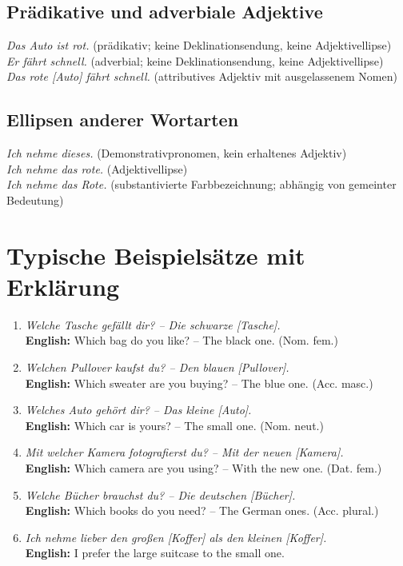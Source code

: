 \documentclass[a4paper,11pt]{article}
\begin{document}
\subsection{Prädikative und adverbiale Adjektive}
\textit{Das Auto ist rot.} (prädikativ; keine Deklinationsendung, keine Adjektivellipse)\\
\textit{Er fährt schnell.} (adverbial; keine Deklinationsendung, keine Adjektivellipse)\\
\textit{Das rote [Auto] fährt schnell.} (attributives Adjektiv mit ausgelassenem Nomen)

\subsection{Ellipsen anderer Wortarten}
\textit{Ich nehme dieses.} (Demonstrativpronomen, kein erhaltenes Adjektiv)\\
\textit{Ich nehme das rote.} (Adjektivellipse)\\
\textit{Ich nehme das Rote.} (substantivierte Farbbezeichnung; abhängig von gemeinter Bedeutung)

\section{Typische Beispielsätze mit Erklärung}
\begin{enumerate}
\item \textit{Welche Tasche gefällt dir? -- Die schwarze [Tasche].}\\
\textbf{English:} Which bag do you like? -- The black one. (Nom. fem.)
\item \textit{Welchen Pullover kaufst du? -- Den blauen [Pullover].}\\
\textbf{English:} Which sweater are you buying? -- The blue one. (Acc. masc.)
\item \textit{Welches Auto gehört dir? -- Das kleine [Auto].}\\
\textbf{English:} Which car is yours? -- The small one. (Nom. neut.)
\item \textit{Mit welcher Kamera fotografierst du? -- Mit der neuen [Kamera].}\\
\textbf{English:} Which camera are you using? -- With the new one. (Dat. fem.)
\item \textit{Welche Bücher brauchst du? -- Die deutschen [Bücher].}\\
\textbf{English:} Which books do you need? -- The German ones. (Acc. plural.)
\item \textit{Ich nehme lieber den großen [Koffer] als den kleinen [Koffer].}\\
\textbf{English:} I prefer the large suitcase to the small one.
\end{enumerate}
\end{document}
